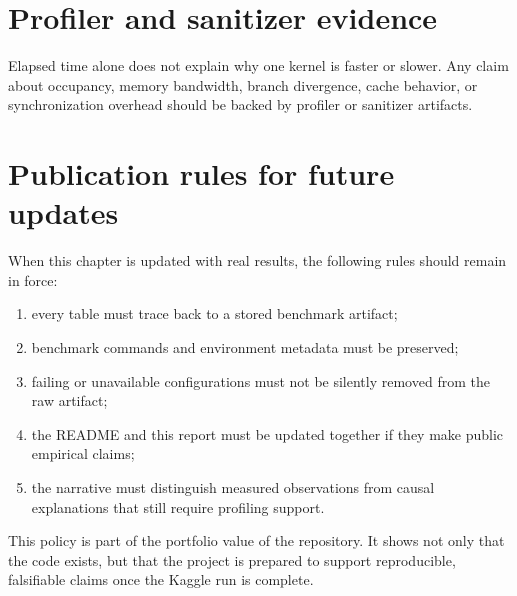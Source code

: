 \section{Profiler and sanitizer evidence}

Elapsed time alone does not explain why one kernel is faster or slower. Any claim about occupancy, memory bandwidth, branch divergence, cache behavior, or synchronization overhead should be backed by profiler or sanitizer artifacts.


\section{Publication rules for future updates}

When this chapter is updated with real results, the following rules should remain in force:
\begin{enumerate}
  \item every table must trace back to a stored benchmark artifact;
  \item benchmark commands and environment metadata must be preserved;
  \item failing or unavailable configurations must not be silently removed from the raw artifact;
  \item the README and this report must be updated together if they make public empirical claims;
  \item the narrative must distinguish measured observations from causal explanations that still require profiling support.
\end{enumerate}

This policy is part of the portfolio value of the repository. It shows not only that the code exists, but that the project is prepared to support reproducible, falsifiable claims once the Kaggle run is complete.
